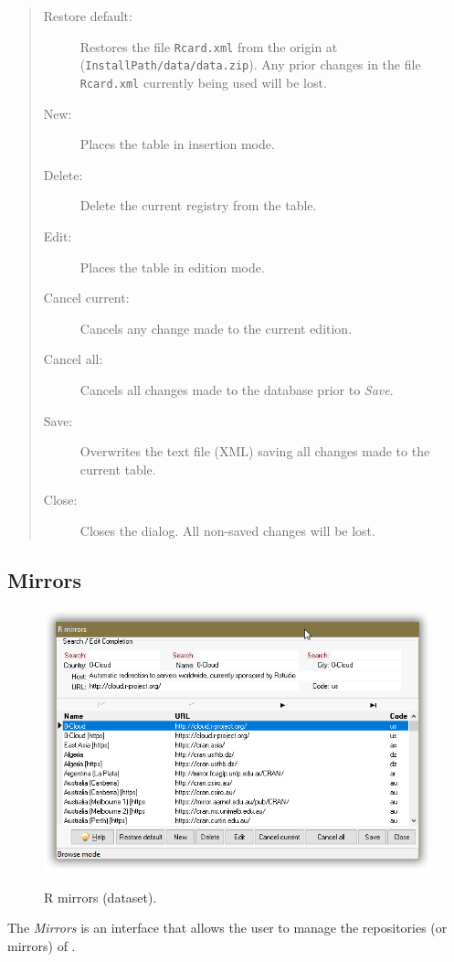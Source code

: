 \begin{quote}
  \begin{footnotesize}
    \begin{description}
      \item[Restore default:]
        Restores the file \texttt{Rcard.xml} from the origin at
        (\texttt{InstallPath/data/data.zip}). Any prior changes in the
        file \texttt{Rcard.xml} currently being used will be lost.
      \item[New:]
        Places the table in insertion mode.
      \item[Delete:]
        Delete the current registry from the table.
      \item[Edit:]
        Places the table in edition mode.
      \item[Cancel current:]
        Cancels any change made to the current edition.
      \item[Cancel all:]
        Cancels all changes made to the database prior to \textit{Save}.
      \item[Save:]
        Overwrites the text file (XML) saving all changes made to the current table.
      \item[Close:]
        Closes the dialog. All non-saved changes will be lost.
    \end{description}
  \end{footnotesize}
\end{quote}


\hypertarget{dlg_mirrors}{}
\subsection{Mirrors}

\begin{figure}[H]
  \includegraphics[scale=0.35]{./res/dlg_mirrors.png}\\
  \caption{R mirrors (dataset).}
  \label{fig:dlg_mirrors}
\end{figure}
The \textit{Mirrors} is an interface that allows the user to manage the
repositories (or mirrors) of \RR{}.

